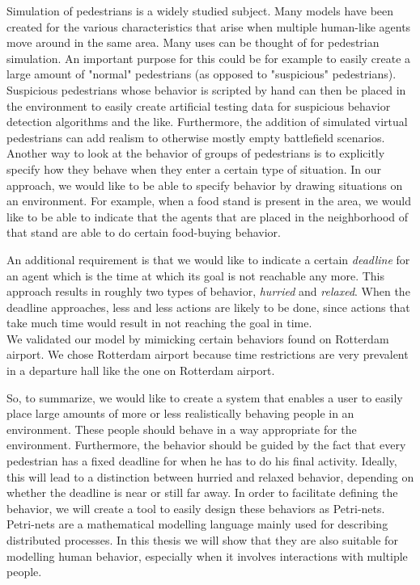 \documentclass[11pt]{book}
\begin{document}
Simulation of pedestrians is a widely studied subject. Many models have been created for the various characteristics that arise when multiple human-like agents move around in the same area. Many uses can be thought of for pedestrian simulation. An important purpose for this could be for example to easily create a large amount of "normal" pedestrians (as opposed to "suspicious" pedestrians).  Suspicious pedestrians whose behavior is scripted by hand can then be placed in the environment to easily create artificial testing data for suspicious behavior detection algorithms and the like. Furthermore, the addition of simulated virtual pedestrians can add realism to otherwise mostly empty battlefield scenarios.\\
Another way to look at the behavior of groups of pedestrians is to explicitly specify how they behave when they enter a certain type of situation. In our approach, we would like to be able to specify behavior by drawing situations on an environment. For example, when a food stand is present in the area, we would like to be able to indicate that the agents that are placed in the neighborhood of that stand are able to do certain food-buying behavior.

An additional requirement is that we would like to indicate a certain \emph{deadline} for an agent which is the time at which its goal is not reachable any more. This approach results in roughly two types of behavior, \emph{hurried} and \emph{relaxed}. When the deadline approaches, less and less actions are likely to be done, since actions that take much time would result in not reaching the goal in time.\\
We validated our model by mimicking certain behaviors found on Rotterdam airport. We chose Rotterdam airport because time restrictions are very prevalent in a departure hall like the one on Rotterdam airport.

So, to summarize, we would like to create a system that enables a user to easily place large amounts of more or less realistically behaving people in an environment. These people should behave in a way appropriate for the environment. Furthermore, the behavior should be guided by the fact that every pedestrian has a fixed deadline for when he has to do his final activity. Ideally, this will lead to a distinction between hurried and relaxed behavior, depending on whether the deadline is near or still far away. In order to facilitate defining the behavior, we will create a tool to easily design these behaviors as Petri-nets. Petri-nets are a mathematical modelling language mainly used for describing distributed processes. In this thesis we will show that they are also suitable for modelling human behavior, especially when it involves interactions with multiple people.
\end{document}
